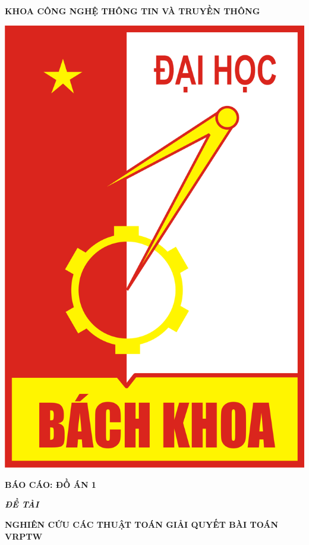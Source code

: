 \documentclass[12pt,a4paper]{article}\author{Nguyễn Nho Dũng}
\begin{document}
\begin{titlepage}
\begin{center}
		\vspace{7pt}
		\textbf{KHOA CÔNG NGHỆ THÔNG TIN VÀ TRUYỀN THÔNG}
	\end{center}
	\vspace{30pt}
	\begin{center}
		\includegraphics[scale=0.3]{Anh/hust.png}
		
		\vspace{30pt}
		\fontsize{18pt}{17pt}\selectfont 
		\textbf{BÁO CÁO: ĐỒ ÁN 1} 
	\end{center}
	\begin{center}
            \vspace{15pt}
		\fontsize{14pt}{17pt}\selectfont  
		\textbf{\textsl{ĐỀ TÀI}}
	\end{center}
	\begin{center}
		\fontsize{18pt}{17pt}\selectfont 
		\textbf{\textrm{NGHIÊN CỨU CÁC THUẬT TOÁN GIẢI QUYẾT BÀI TOÁN VRPTW}}
	\end{center}
	

\end{titlepage}
\end{document}
